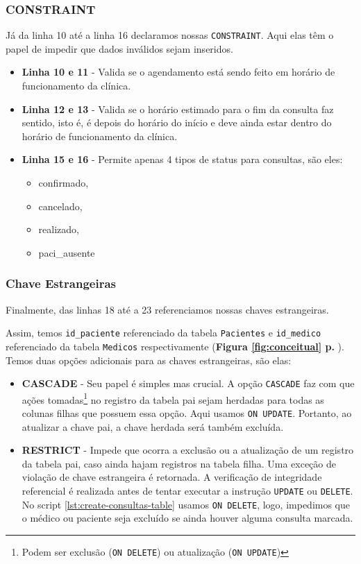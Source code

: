 \subsubsection{CONSTRAINT} %

Já da linha 10 até a linha 16 declaramos nossas \texttt{CONSTRAINT}. Aqui elas têm o papel de impedir que dados inválidos sejam inseridos.
\begin{itemize}
    \item \textbf{Linha 10 e 11} - Valida se o agendamento está sendo feito em horário de funcionamento da clínica.
    \item \textbf{Linha 12 e 13} - Valida se o horário estimado para o fim da consulta faz sentido, isto é, é depois do horário do início e deve ainda estar dentro do horário de funcionamento da clínica.
    \item \textbf{Linha 15 e 16} - Permite apenas 4 tipos de status para consultas, são eles:
        \begin{itemize}
            \item confirmado,
            \item cancelado,
            \item realizado,
            \item paci\_ausente 
        \end{itemize}
\end{itemize}


\subsubsection{Chave Estrangeiras} %

Finalmente, das linhas 18 até a 23 referenciamos nossas chaves estrangeiras.

Assim, temos \texttt{id\_paciente} referenciado da tabela \texttt{Pacientes} e \texttt{id\_medico} referenciado da tabela \texttt{Medicos} respectivamente (\textbf{Figura \ref{fig:conceitual} p. \pageref{fig:conceitual}}). Temos duas opções adicionais para as chaves estrangeiras, são elas:
\begin{itemize}
    \item \textbf{CASCADE} - Seu papel é simples mas crucial. A opção \texttt{CASCADE} faz com que ações tomadas\footnote{Podem ser exclusão (\texttt{ON DELETE}) ou atualização (\texttt{ON UPDATE})} no registro da tabela pai sejam herdadas para todas as colunas filhas que possuem essa opção\cite{delete_cascade}. Aqui usamos \texttt{ON UPDATE}. Portanto, ao atualizar a chave pai, a chave herdada será também excluída.
    \item \textbf{RESTRICT} - Impede que ocorra a exclusão ou a atualização de um registro da tabela pai, caso ainda hajam registros na tabela filha. Uma exceção de violação de chave estrangeira é retornada. A verificação de integridade referencial é realizada antes de tentar executar a instrução \texttt{UPDATE} ou \texttt{DELETE}\cite{delete_cascade}.
    No script \ref{lst:create-consultas-table} usamos \texttt{ON DELETE}, logo, impedimos que o médico ou paciente seja excluído se ainda houver alguma consulta marcada.
\end{itemize}

